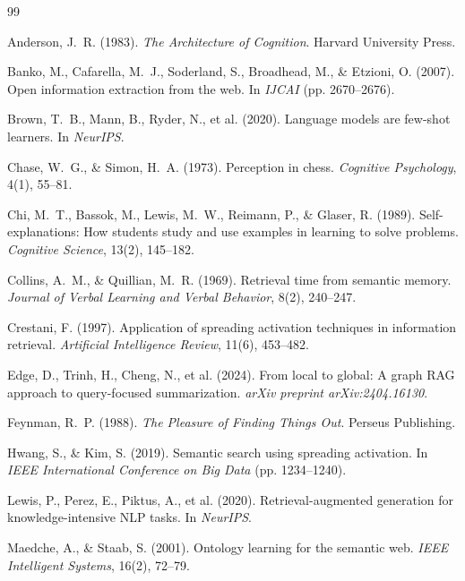 \documentclass[11pt]{article}
\begin{document}

\begin{thebibliography}{99}

Anderson, J.~R. (1983).
\textit{The Architecture of Cognition}.
Harvard University Press.

Banko, M., Cafarella, M.~J., Soderland, S., Broadhead, M., \& Etzioni, O. (2007).
Open information extraction from the web.
In \textit{IJCAI} (pp. 2670--2676).

Brown, T.~B., Mann, B., Ryder, N., et al. (2020).
Language models are few-shot learners.
In \textit{NeurIPS}.

Chase, W.~G., \& Simon, H.~A. (1973).
Perception in chess.
\textit{Cognitive Psychology}, 4(1), 55--81.

Chi, M.~T., Bassok, M., Lewis, M.~W., Reimann, P., \& Glaser, R. (1989).
Self-explanations: How students study and use examples in learning to solve problems.
\textit{Cognitive Science}, 13(2), 145--182.

Collins, A.~M., \& Quillian, M.~R. (1969).
Retrieval time from semantic memory.
\textit{Journal of Verbal Learning and Verbal Behavior}, 8(2), 240--247.

Crestani, F. (1997).
Application of spreading activation techniques in information retrieval.
\textit{Artificial Intelligence Review}, 11(6), 453--482.

Edge, D., Trinh, H., Cheng, N., et al. (2024).
From local to global: A graph RAG approach to query-focused summarization.
\textit{arXiv preprint arXiv:2404.16130}.

Feynman, R.~P. (1988).
\textit{The Pleasure of Finding Things Out}.
Perseus Publishing.

Hwang, S., \& Kim, S. (2019).
Semantic search using spreading activation.
In \textit{IEEE International Conference on Big Data} (pp. 1234--1240).

Lewis, P., Perez, E., Piktus, A., et al. (2020).
Retrieval-augmented generation for knowledge-intensive NLP tasks.
In \textit{NeurIPS}.

Maedche, A., \& Staab, S. (2001).
Ontology learning for the semantic web.
\textit{IEEE Intelligent Systems}, 16(2), 72--79.


\end{thebibliography}
\end{document}

